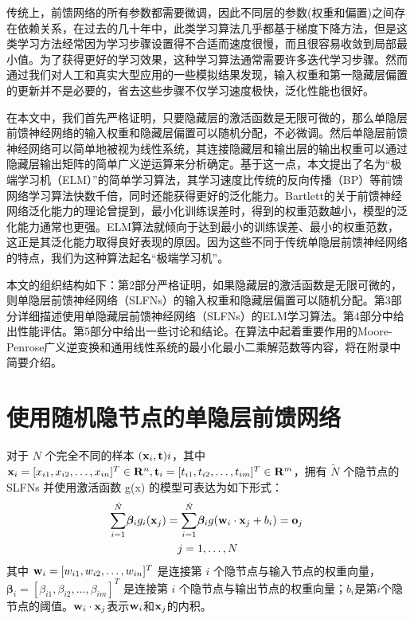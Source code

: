 \documentclass[conference]{IEEEtran}
\begin{document}
传统上，前馈网络的所有参数都需要微调，因此不同层的参数(权重和偏置)之间存在依赖关系，在过去的几十年中，此类学习算法几乎都基于梯度下降方法，但是这类学习方法经常因为学习步骤设置得不合适而速度很慢，而且很容易收敛到局部最小值。为了获得更好的学习效果，这种学习算法通常需要许多迭代学习步骤。然而通过我们对人工和真实大型应用的一些模拟结果发现，输入权重和第一隐藏层偏置的更新并不是必要的，省去这些步骤不仅学习速度极快，泛化性能也很好。

在本文中，我们首先严格证明，只要隐藏层的激活函数是无限可微的，那么单隐层前馈神经网络的输入权重和隐藏层偏置可以随机分配，不必微调。然后单隐层前馈神经网络可以简单地被视为线性系统，其连接隐藏层和输出层的输出权重可以通过隐藏层输出矩阵的简单广义逆运算来分析确定。基于这一点，本文提出了名为“极端学习机（ELM）”的简单学习算法，其学习速度比传统的反向传播（BP）等前馈网络学习算法快数千倍，同时还能获得更好的泛化能力。Bartlett的关于前馈神经网络泛化能力的理论曾提到，最小化训练误差时，得到的权重范数越小，模型的泛化能力通常也更强。ELM算法就倾向于达到最小的训练误差、最小的权重范数，这正是其泛化能力取得良好表现的原因。因为这些不同于传统单隐层前馈神经网络的特点，我们为这种算法起名“极端学习机”。

本文的组织结构如下：第2部分严格证明，如果隐藏层的激活函数是无限可微的，则单隐层前馈神经网络（SLFNs）的输入权重和隐藏层偏置可以随机分配。第3部分详细描述使用单隐藏层前馈神经网络（SLFNs）的ELM学习算法。第4部分中给出性能评估。第5部分中给出一些讨论和结论。在算法中起着重要作用的Moore-Penrose广义逆变换和通用线性系统的最小化最小二乘解范数等内容，将在附录中简要介绍。


\section{使用随机隐节点的单隐层前馈网络}

对于 $N$ 个完全不同的样本 $({\bf x}_i, {\bf t})i$，其中 ${\bf x}_i=[x_{i1},x_{i2},\dots,x_{in}]^T\in{\bf R}^n, {\bf t}_i=[t_{i1},t_{i2},\dots,t_{im}]^T\in{\bf R}^m$，拥有 $\tilde N$ 个隐节点的 SLFNs 并使用激活函数 g(x) 的模型可表达为如下形式：
\begin{align}\label{eq1}
	\overset{\tilde{N}}{\underset{i=1}{\sum}}{{\bm{\beta}}_i}{g_i}({\bf{x}}_j)&=\overset{\tilde{N}}{\underset{i=1}{\sum}}{{\bm{\beta}}_i}g({{\bf{w}}_i}\cdot{{\bf{x}}_j}+b_i)={\bf{o}}_j\notag\\
	&\quad j=1,\dots,N
\end{align}
其中 $ {\bf{w}}_i=[w_{i1},w_{i2},\dots,w_{in}]^T $ 是连接第 $i$ 个隐节点与输入节点的权重向量，$ {\bm{\beta}}_i=[\beta_{i1},\beta_{i2},\dots,\beta_{im}]^T $ 是连接第 $i$ 个隐节点与输出节点的权重向量；$b_i$是第$i$个隐节点的阈值。${{\bf{w}}_i}\cdot{{\bf{x}}_j}$表示${{\bf{w}}_i}$和${{\bf{x}}_j}$的内积。
\end{document}

